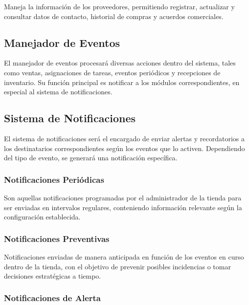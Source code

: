 Maneja la información de los proveedores, permitiendo registrar, actualizar y consultar 
datos de contacto, historial de compras y acuerdos comerciales.












\subsection{Manejador de Eventos}

El manejador de eventos procesará diversas acciones dentro del sistema, tales como ventas, asignaciones de tareas, eventos 
periódicos y recepciones de inventario. Su función principal es notificar a los módulos correspondientes, en especial al 
sistema de notificaciones.

\subsection{Sistema de Notificaciones}

El sistema de notificaciones será el encargado de enviar alertas y recordatorios a los destinatarios correspondientes 
según los eventos que lo activen. Dependiendo del tipo de evento, se generará una notificación específica.

\subsubsection{Notificaciones Periódicas}

Son aquellas notificaciones programadas por el administrador de la tienda para ser enviadas en intervalos regulares, 
conteniendo información relevante según la configuración establecida.

\subsubsection{Notificaciones Preventivas}

Notificaciones enviadas de manera anticipada en función de los eventos en curso dentro de la tienda, con el objetivo de 
prevenir posibles incidencias o tomar decisiones estratégicas a tiempo.

\subsubsection{Notificaciones de Alerta}

